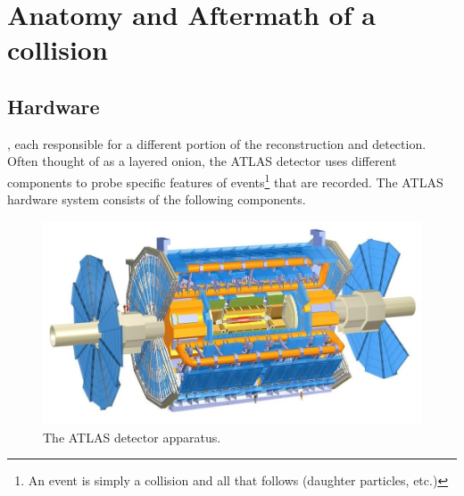 
\chapter{Anatomy and Aftermath of a collision}

\section{Hardware}

, each responsible for a different portion of the reconstruction and detection. Often thought of as a layered onion, the ATLAS detector uses different components to probe specific features of events\footnote{An event is simply a collision and all that follows (daughter particles, etc.)} that are recorded. The ATLAS hardware system consists of the following components.

\begin{figure}
\includegraphics[width=\textwidth]{figures/ATLAS.jpeg}
\caption[The ATLAS detector]{The ATLAS detector apparatus.
\label{fig:thedetector}}
\end{figure}



